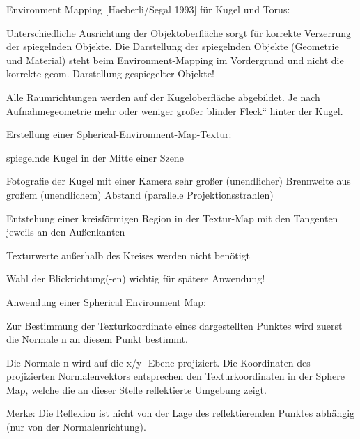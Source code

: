 \documentclass[landscape]{article}
\begin{document}
\begin{multicols}{3}
  Environment Mapping [Haeberli/Segal 1993] für Kugel und Torus: 
  \begin{itemize*}
    \item Unterschiedliche Ausrichtung der Objektoberfläche sorgt für korrekte Verzerrung der spiegelnden Objekte. Die Darstellung der spiegelnden Objekte (Geometrie und Material) steht beim Environment-Mapping im Vordergrund und nicht die korrekte geom. Darstellung gespiegelter Objekte!
    \item Alle Raumrichtungen werden auf der Kugeloberfläche abgebildet. Je nach Aufnahmegeometrie mehr oder weniger großer blinder Fleck“ hinter der Kugel.
  \end{itemize*}
  
  
  Erstellung einer Spherical-Environment-Map-Textur:
  \begin{itemize*}
    \item spiegelnde Kugel in der Mitte einer Szene
    \item Fotografie der Kugel mit einer Kamera sehr großer (unendlicher) Brennweite aus großem (unendlichem) Abstand (parallele Projektionsstrahlen)
    \item Entstehung einer kreisförmigen Region in der Textur-Map mit den Tangenten jeweils an den Außenkanten
    \item Texturwerte außerhalb des Kreises werden nicht benötigt
    \item Wahl der Blickrichtung(-en) wichtig für spätere Anwendung!
  \end{itemize*}
  
  Anwendung einer Spherical Environment Map:
  \begin{itemize*}
    \item Zur Bestimmung der Texturkoordinate eines dargestellten Punktes wird zuerst die Normale n an diesem Punkt bestimmt.
    \item Die Normale n wird auf die x/y- Ebene projiziert. Die Koordinaten des projizierten Normalenvektors entsprechen den Texturkoordinaten in der Sphere Map, welche die an dieser Stelle reflektierte Umgebung zeigt.
    \item Merke: Die Reflexion ist nicht von der Lage des reflektierenden Punktes abhängig (nur von der Normalenrichtung).
  \end{itemize*}
  

\end{multicols}
\end{document}
